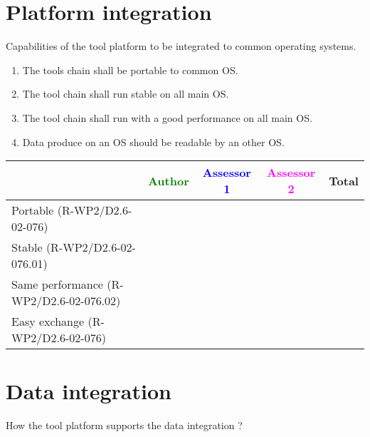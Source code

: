 \section{Platform integration}
Capabilities of the tool platform to  be integrated to common operating systems.
\begin{enumerate}
\item  The tools chain shall be portable to common \gls{OS}.
\item   The tool chain shall run stable on all main \gls{OS}.
\item  The tool chain shall run with a good performance on all main \gls{OS}.
\item  Data produce on an \gls{OS} should be readable by an other \gls{OS}.
\end{enumerate}
\begin{tabular}{|l | c | c | c | c|}
  \hline
  & \textcolor{green}{Author} & \textcolor{blue}{Assessor 1} &  \textcolor{magenta}{Assessor 2} & Total \\
  \hline  Portable (R-WP2/D2.6-02-076) &
  &                 &                  &\\
  \hline   Stable (R-WP2/D2.6-02-076.01)&
  &                 &                  &\\
  \hline   Same performance (R-WP2/D2.6-02-076.02)&
  &                 &                  &\\
  \hline  Easy exchange (R-WP2/D2.6-02-076)&
  &                 &                  &\\
  \hline
\end{tabular}


\section{Data integration}
How the tool platform supports the data integration ?

